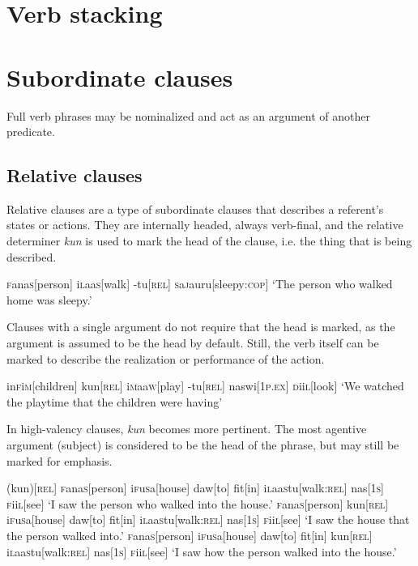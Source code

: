\documentclass[a4paper,10pt,twoside,openright]{memoir}
\newcommand{\famword}[5]{#1\textsc{#2}#3\textsc{#4}#5}
\begin{document}
\section{Verb stacking}

\section{Subordinate clauses}

Full verb phrases may be nominalized and act as an argument of another predicate.

\subsection{Relative clauses}

Relative clauses are a type of subordinate clauses that describes a referent's states or actions. They are internally headed, always verb-final, and the relative determiner \emph{kun} is used to mark the head of the clause, i.e. the thing that is being described.

\ex
\begingl
\famword{}{f}{ana}{s}{}[person]
\famword{i}{l}{aa}{s}{}[walk]
-tu[\textsc{rel}]
\famword{}{s}{a}{j}{a}uru[sleepy:\textsc{cop}]
\glft `The person who walked home was sleepy.'
\endgl
\xe

Clauses with a single argument do not require that the head is marked, as the argument is assumed to be the head by default. Still, the verb itself can be marked to describe the realization or performance of the action.

\ex
\begingl
\famword{in}{f}{i}{m}{}[children]
kun[\textsc{rel}]
\famword{i}{m}{aa}{w}{}[play]
-tu[\textsc{rel}]
naswi[\textsc{1p.ex}]
\famword{}{d}{ii}{l}{}[look]
\glft `We watched the playtime that the children were having'
\endgl
\xe

In high-valency clauses, \emph{kun} becomes more pertinent. The most agentive argument (subject) is considered to be the head of the phrase, but may still be marked for emphasis.

\pex[interpartskip=3ex]
\a
\begingl
(kun)[\textsc{rel}]
\famword{}{f}{ana}{s}{}[person]
\famword{i}{f}{u}{s}{a}[house]
daw[to]
fit[in]
\famword{i}{l}{aa}{s}{}tu[walk\textsc{:rel}]
nas[\textsc{1s}]
\famword{}{f}{ii}{l}{}[see]
\glft `I saw the person who walked into the house.'
\endgl
\a
\begingl
\famword{}{f}{ana}{s}{}[person]
kun[\textsc{rel}]
\famword{i}{f}{u}{s}{a}[house]
daw[to]
fit[in]
\famword{i}{l}{aa}{s}{}tu[walk\textsc{:rel}]
nas[\textsc{1s}]
\famword{}{f}{ii}{l}{}[see]
\glft `I saw the house that the person walked into.'
\endgl
\a
\begingl
\famword{}{f}{ana}{s}{}[person]
\famword{i}{f}{u}{s}{a}[house]
daw[to]
fit[in]
kun[\textsc{rel}]
\famword{i}{l}{aa}{s}{}tu[walk\textsc{:rel}]
nas[\textsc{1s}]
\famword{}{f}{ii}{l}{}[see]
\glft `I saw how the person walked into the house.'
\endgl
\xe
\end{document}
